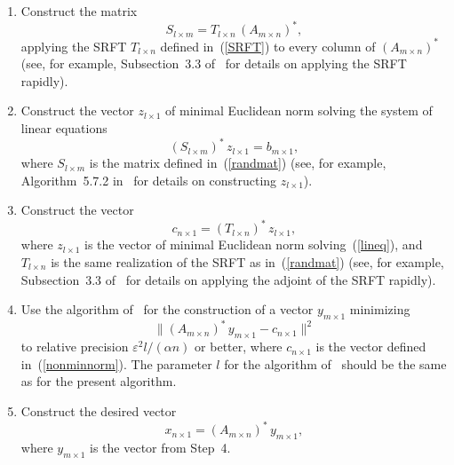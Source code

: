 \documentclass[letterpaper,12pt]{article}
\def\epsilon{\varepsilon}
\begin{document}
\begin{enumerate}
\item Construct the matrix
\begin{equation}
      \label{randmat}
      S_{l \times m} = T_{l \times n} \, (A_{m \times n})^*,
      \end{equation}
applying the SRFT $T_{l \times n}$ defined in~(\ref{SRFT})
      to every column of $(A_{m \times n})^*$
      (see, for example, Subsection~3.3 of~\cite{woolfe-liberty-rokhlin-tygert}
      for details on applying the SRFT rapidly).
\item Construct the vector $z_{l \times 1}$ of minimal Euclidean norm
      solving the system of linear equations
\begin{equation}
      \label{lineq}
      (S_{l \times m})^* \, z_{l \times 1} = b_{m \times 1},
      \end{equation}
where $S_{l \times m}$ is the matrix defined in~(\ref{randmat})
      (see, for example, Algorithm~5.7.2 in~\cite{golub-van_loan}
      for details on constructing $z_{l \times 1}$).
\item Construct the vector
\begin{equation}
      \label{nonminnorm}
      c_{n \times 1} = (T_{l \times n})^* \, z_{l \times 1},
      \end{equation}
where $z_{l \times 1}$ is the vector of minimal Euclidean norm
      solving~(\ref{lineq}), and $T_{l \times n}$ is the same realization
      of the SRFT as in~(\ref{randmat})
      (see, for example, Subsection~3.3 of~\cite{woolfe-liberty-rokhlin-tygert}
      for details on applying the adjoint of the SRFT rapidly).
\item Use the algorithm of~\cite{rokhlin-tygert} for the construction
      of a vector $y_{m \times 1}$ minimizing
\begin{equation}
      \label{overdet}
      \| (A_{m \times n})^* \, y_{m \times 1} - c_{n \times 1} \|^2
      \end{equation}
to relative precision $\epsilon^2 l/(\alpha n)$ or better,
      where $c_{n \times 1}$ is the vector defined in~(\ref{nonminnorm}).
      The parameter $l$ for the algorithm of~\cite{rokhlin-tygert}
      should be the same as for the present algorithm.
\item Construct the desired vector
\begin{equation}
      \label{output}
      x_{n \times 1} = (A_{m \times n})^* \, y_{m \times 1},
      \end{equation}
where $y_{m \times 1}$ is the vector from Step~4.
\end{enumerate}
\end{document}

